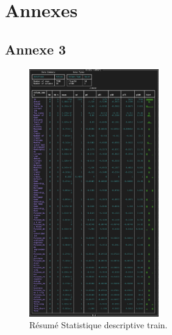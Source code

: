 
\chapter*{Annexes}

\section*{Annexe 3}
\label{sec:annexe3}
\begin{figure}[H]
\centering
\includegraphics[width=0.5\textwidth]{figures/Annexe3.png}
\caption{Résumé Statistique descriptive train.}
\label{fig:annexe3}
\end{figure}

